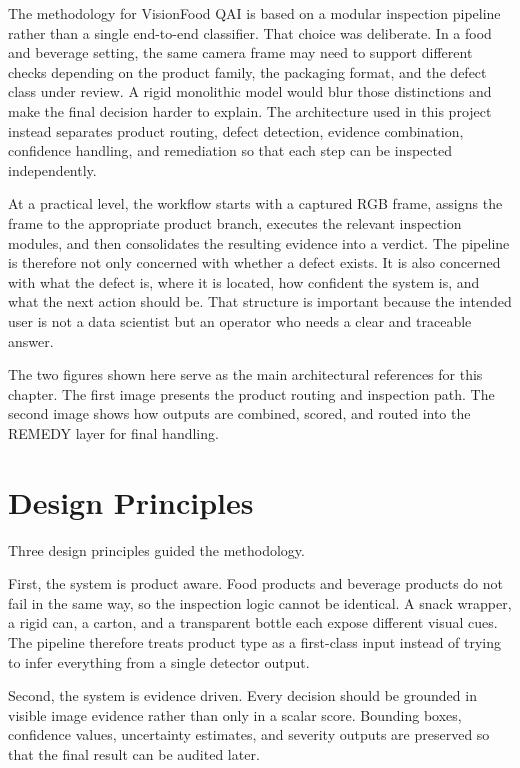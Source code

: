 \documentclass[12pt,a4paper]{report}
\newcommand{\shorttitle}{VisionFood QAI}
\begin{document}
The methodology for \shorttitle{} is based on a modular inspection pipeline rather than a single end-to-end classifier. That choice was deliberate. In a food and beverage setting, the same camera frame may need to support different checks depending on the product family, the packaging format, and the defect class under review. A rigid monolithic model would blur those distinctions and make the final decision harder to explain. The architecture used in this project instead separates product routing, defect detection, evidence combination, confidence handling, and remediation so that each step can be inspected independently.

At a practical level, the workflow starts with a captured RGB frame, assigns the frame to the appropriate product branch, executes the relevant inspection modules, and then consolidates the resulting evidence into a verdict. The pipeline is therefore not only concerned with whether a defect exists. It is also concerned with what the defect is, where it is located, how confident the system is, and what the next action should be. That structure is important because the intended user is not a data scientist but an operator who needs a clear and traceable answer.

The two figures shown here serve as the main architectural references for this chapter. The first image presents the product routing and inspection path. The second image shows how outputs are combined, scored, and routed into the REMEDY layer for final handling.

\section{Design Principles}
\label{sec:design-principles}

Three design principles guided the methodology.

First, the system is product aware. Food products and beverage products do not fail in the same way, so the inspection logic cannot be identical. A snack wrapper, a rigid can, a carton, and a transparent bottle each expose different visual cues. The pipeline therefore treats product type as a first-class input instead of trying to infer everything from a single detector output.

Second, the system is evidence driven. Every decision should be grounded in visible image evidence rather than only in a scalar score. Bounding boxes, confidence values, uncertainty estimates, and severity outputs are preserved so that the final result can be audited later.
\end{document}
